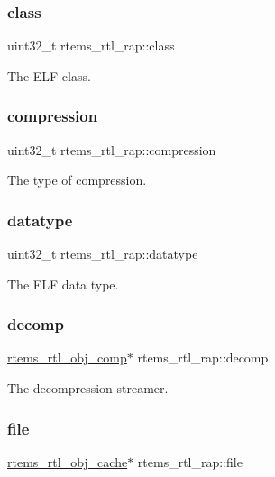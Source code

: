 \subsubsection{\texorpdfstring{class}{class}}
{\footnotesize\ttfamily uint32\+\_\+t rtems\+\_\+rtl\+\_\+rap\+::class}

The E\+LF class. \mbox{\label{structrtems__rtl__rap_aa4f1c0b92d667a202f120a497a78a7c1}} 
\subsubsection{\texorpdfstring{compression}{compression}}
{\footnotesize\ttfamily uint32\+\_\+t rtems\+\_\+rtl\+\_\+rap\+::compression}

The type of compression. \mbox{\label{structrtems__rtl__rap_a5acb948026166381bfd8496014f0c2dd}} 
\subsubsection{\texorpdfstring{datatype}{datatype}}
{\footnotesize\ttfamily uint32\+\_\+t rtems\+\_\+rtl\+\_\+rap\+::datatype}

The E\+LF data type. \mbox{\label{structrtems__rtl__rap_ab260e347c29aae508f8c1f2c1ad0f372}} 
\subsubsection{\texorpdfstring{decomp}{decomp}}
{\footnotesize\ttfamily \mbox{\hyperlink{rtl-obj-comp_8h_a5ac76d7cdc14a520157bd5c8a322f56c}{rtems\+\_\+rtl\+\_\+obj\+\_\+comp}}$\ast$ rtems\+\_\+rtl\+\_\+rap\+::decomp}

The decompression streamer. \mbox{\label{structrtems__rtl__rap_a43547b4ee32a64a5cce9e147dd14fb2f}} 
\subsubsection{\texorpdfstring{file}{file}}
{\footnotesize\ttfamily \mbox{\hyperlink{structrtems__rtl__obj__cache}{rtems\+\_\+rtl\+\_\+obj\+\_\+cache}}$\ast$ rtems\+\_\+rtl\+\_\+rap\+::file}

